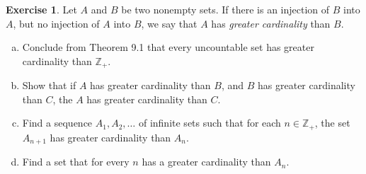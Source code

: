 \documentclass[11pt,a4paper,twoside]{article}
\theoremstyle{definition}
\newcounter{excounter}
\newtheorem{exercise}[excounter]{Exercise}
\begin{document}
\begin{exercise}

  Let $A$ and $B$ be two nonempty sets. If there is an injection of $B$ into $A$,
  but no injection of $A$ into $B$, we say that $A$ has \emph{greater cardinality} than $B$.
  \begin{enumerate}[(a)]

  \item Conclude from Theorem 9.1 that every uncountable set has greater cardinality than $\mathbb{Z}_+$.
  \item Show that if $A$ has greater cardinality than $B$, and $B$ has greater cardinality than $C$,
    the $A$ has greater cardinality than $C$.
  \item Find a sequence $A_1, A_2, \dotsc$ of infinite sets such that for each $n \in \mathbb{Z}_+$,
    the set $A_{n + 1}$ has greater cardinality than $A_n$.
  \item Find a set that for every $n$ has a greater cardinality than $A_n$.

  \end{enumerate}

\end{exercise}
\end{document}
